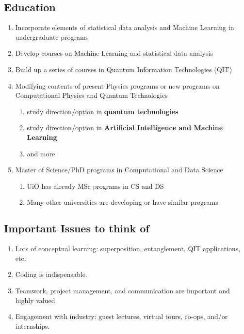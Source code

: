 \documentclass[%
oneside,                 %
final,                   %
10pt]{article}
\begin{document}
\noindent
\subsection{Education}

\begin{enumerate}
\item Incorporate elements of statistical data analysis and Machine Learning in undergraduate programs

\item Develop courses on Machine Learning and statistical data analysis

\item Build up a series of courses in Quantum Information Technologies (QIT)

\item Modifying contents of present Physics programs or new programs on  Computational Physics and Quantum Technologies
\begin{enumerate}

 \item study direction/option in \textbf{quantum technologies}

 \item study direction/option in \textbf{Artificial Intelligence and Machine Learning}

 \item and more

\end{enumerate}

\noindent
\item Master of Science/PhD programs in Computational and Data Science
\begin{enumerate}

 \item UiO has already MSc programs in CS and DS

 \item Many other universities are developing or have similar programs
\end{enumerate}

\noindent
\end{enumerate}

\noindent
\subsection{Important Issues to think of}

\begin{enumerate}
\item Lots of conceptual learning: superposition, entanglement, QIT applications, etc.

\item Coding is indispensable. 

\item Teamwork, project management, and communication are important and highly valued

\item Engagement with industry: guest lectures, virtual tours, co-ops, and/or internships.
\end{enumerate}
\end{document}
